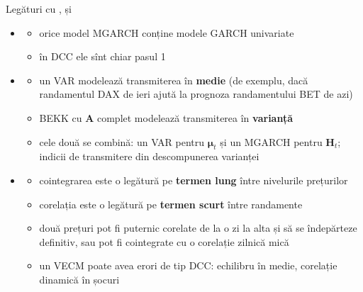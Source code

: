 \begin{frame}{Legături cu ,  și }
\itemsize{\small}
\begin{itemize}
    \item \textbf{}
    \begin{itemize}
        \item orice model MGARCH conține modele GARCH univariate
        \item în DCC ele sînt chiar pasul 1
    \end{itemize}
    \item \textbf{}
    \begin{itemize}
        \item un VAR modelează transmiterea în \textbf{medie} (de exemplu, dacă randamentul DAX de ieri ajută la prognoza randamentului BET de azi)
        \item BEKK cu $\mathbf{A}$ complet modelează transmiterea în \textbf{varianță}
        \item cele două se combină: un VAR pentru $\boldsymbol{\mu}_t$ și un MGARCH pentru $\mathbf{H}_t$; indicii de transmitere din descompunerea varianței 
    \end{itemize}
    \item \textbf{}
    \begin{itemize}
        \item cointegrarea este o legătură pe \textbf{termen lung} între nivelurile prețurilor
        \item corelația este o legătură pe \textbf{termen scurt} între randamente
        \item două prețuri pot fi puternic corelate de la o zi la alta și să se îndepărteze definitiv, sau pot fi cointegrate cu o corelație zilnică mică
        \item un VECM poate avea erori de tip DCC: echilibru în medie, corelație dinamică în șocuri
    \end{itemize}
\end{itemize}
\end{frame}

